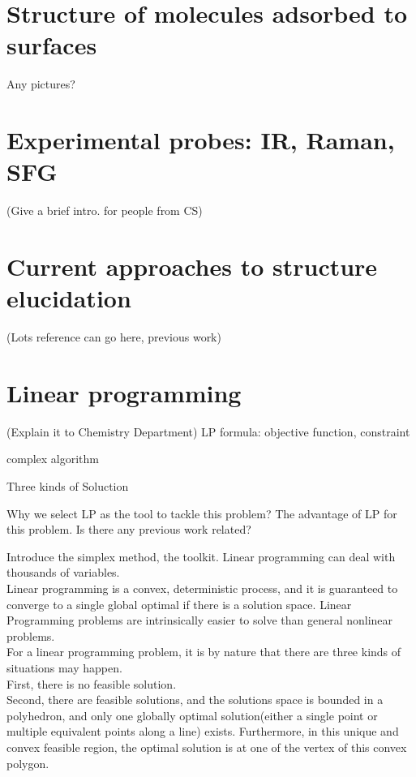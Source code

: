 \label{chapter:introduction}
\section{Structure of molecules adsorbed to surfaces}

Any pictures?

\section{Experimental probes: IR, Raman, SFG}
(Give a brief intro. for people from CS)


\section{Current approaches to structure elucidation}
(Lots reference can go here, previous work)


\section{Linear programming}
(Explain it to Chemistry Department)
LP formula: objective function, constraint

complex algorithm

Three kinds of Soluction

Why we select LP as the tool to tackle this problem? The advantage of LP for this problem. Is there any previous work related?

Introduce the simplex method, the toolkit.
Linear programming can deal with thousands of variables.\\

Linear programming is a convex, deterministic process, and it is guaranteed to converge to a single global optimal if there is a solution space. Linear Programming problems are intrinsically easier to solve than general nonlinear problems.\\

For a linear programming problem, it is by nature that there are three kinds of situations may happen.\\

First, there is no feasible solution.\\

Second, there are feasible solutions, and the solutions space is bounded in a polyhedron, and only one globally optimal solution(either a single point or multiple equivalent points along a line) exists. Furthermore, in this unique and convex feasible region, the optimal solution is at one of the vertex of this convex polygon.\\

